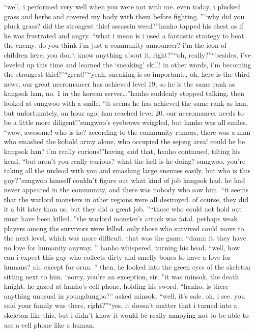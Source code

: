 “well, i performed very well when you were not with me.
 even today, i plucked grass and herbs and covered my body with them before fighting.
”“why did you pluck grass? did the strongest thief assassin weed?”hanho tapped his chest as if he was frustrated and angry.
“what i mean is i used a fantastic strategy to beat the enemy.
 do you think i’m just a community announcer? i’m the icon of children here.
 you don’t know anything about it, right?”“oh, really?”“besides, i’ve leveled up this time and learned the ‘sneaking’ skill! in other words, i’m becoming the strongest thief!”“great!”“yeah, sneaking is so important… oh, here is the third news.
 our great necromancer has achieved level 19, so he is the same rank as kangsok han, no.
 1 in the korean server…”hanho suddenly stopped talking, then looked at sungwoo with a smile.
“it seems he has achieved the same rank as han, but unfortunately, an hour ago, han reached level 20.
 our necromancer needs to be a little more diligent!”sungwoo’s eyebrows wriggled, but hanho was all smiles.
“wow, awesome! who is he? according to the community rumors, there was a man who smashed the kobold army alone, who occupied the sejong area! could he be kangsok han? i’m really curious!”having said that, hanho continued, tilting his head, “but aren’t you really curious? what the hell is he doing? sungwoo, you’re taking all the undead with you and smashing large enemies easily, but who is this guy?”sungwoo himself couldn’t figure out what kind of job kangsok had.
 he had never appeared in the community, and there was nobody who saw him.
“it seems that the warlord monsters in other regions were all destroyed.
 of course, they did it a bit later than us, but they did a great job.
”“those who could not hold out must have been killed.
”the warlord monster’s attack was fatal.
 perhaps weak players among the survivors were killed.
 only those who survived could move to the next level, which was more difficult.
 that was the game.
“damn it.
 they have no love for humanity anyway.
” hanho whispered, turning his head.
 “well, how can i expect this guy who collects dirty and smelly bones to have a love for humans? ah, except for orun.
”
then, he looked into the green eyes of the skeleton sitting next to him.
“sorry, you’re an exception, sir.
”it was minsok, the death knight.
 he gazed at hanho’s cell phone, holding his sword.
 “hanho, is there anything unusual in youngdungpo?” asked minsok.
“well, it’s safe.
 oh, i see.
 you said your family was there, right?”“yes.
 it doesn’t matter that i turned into a skeleton like this, but i didn’t know it would be really annoying not to be able to use a cell phone like a human.
